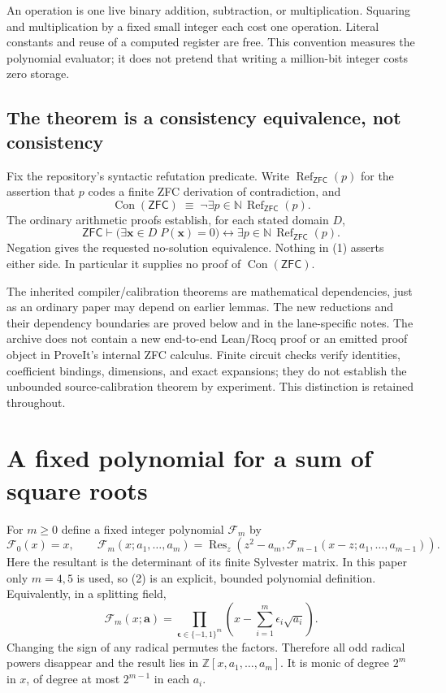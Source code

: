 \documentclass[11pt,letterpaper]{article}
\theoremstyle{definition}\newtheorem{definition}[theorem]{Definition}
\theoremstyle{remark}\newtheorem{remark}[theorem]{Remark}
\newcommand{\Z}{\mathbb Z}\newcommand{\N}{\mathbb N}\newcommand{\Q}{\mathbb Q}
\newcommand{\Con}{\operatorname{Con}}\newcommand{\ZFC}{\mathsf{ZFC}}
\newcommand{\Refute}{\operatorname{Ref}_{\ZFC}}\newcommand{\Ffive}{\mathcal F_5}\newcommand{\Ffour}{\mathcal F_4}
\begin{document}
An operation is one live binary addition, subtraction, or multiplication. Squaring and multiplication by a fixed small integer each cost one operation. Literal constants and reuse of a computed register are free. This convention measures the polynomial evaluator; it does not pretend that writing a million-bit integer costs zero storage.

\subsection{The theorem is a consistency equivalence, not consistency}
Fix the repository's syntactic refutation predicate. Write $\Refute(p)$ for the assertion that $p$ codes a finite ZFC derivation of contradiction, and
\[
 \Con(\ZFC)\;\equiv\;\neg\exists p\in\N\,\Refute(p).
\]
The ordinary arithmetic proofs establish, for each stated domain $D$,
\[
 \ZFC\vdash
 \bigl(\exists\mathbf x\in D\;P(\mathbf x)=0\bigr)
 \longleftrightarrow \exists p\in\N\,\Refute(p).
 \tag{1}\label{eq:logical}
\]
Negation gives the requested no-solution equivalence. Nothing in (1) asserts either side. In particular it supplies no proof of $\Con(\ZFC)$.

The inherited compiler/calibration theorems are mathematical dependencies, just as an ordinary paper may depend on earlier lemmas. The new reductions and their dependency boundaries are proved below and in the lane-specific notes. The archive does not contain a new end-to-end Lean/Rocq proof or an emitted proof object in ProveIt's internal ZFC calculus. Finite circuit checks verify identities, coefficient bindings, dimensions, and exact expansions; they do not establish the unbounded source-calibration theorem by experiment. This distinction is retained throughout.

\section{A fixed polynomial for a sum of square roots}
For $m\geq 0$ define a fixed integer polynomial $\mathcal F_m$ by
\[
 \mathcal F_0(x)=x,
 \qquad
 \mathcal F_m(x;a_1,\ldots,a_m)
 =\operatorname{Res}_{z}\!\left(z^2-a_m,
      \mathcal F_{m-1}(x-z;a_1,\ldots,a_{m-1})\right).
 \tag{2}\label{eq:normdef}
\]
Here the resultant is the determinant of its finite Sylvester matrix. In this paper only $m=4,5$ is used, so (2) is an explicit, bounded polynomial definition. Equivalently, in a splitting field,
\[
 \mathcal F_m(x;\mathbf a)=
 \prod_{\boldsymbol\epsilon\in\{-1,1\}^m}
 \left(x-\sum_{i=1}^m\epsilon_i\sqrt{a_i}\right).
 \tag{3}\label{eq:normproduct}
\]
Changing the sign of any radical permutes the factors. Therefore all odd radical powers disappear and the result lies in $\Z[x,a_1,\ldots,a_m]$. It is monic of degree $2^m$ in $x$, of degree at most $2^{m-1}$ in each $a_i$.
\end{document}

